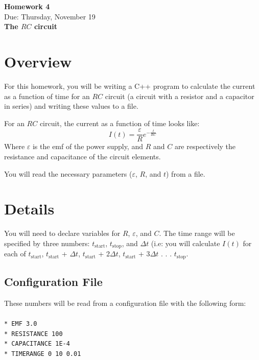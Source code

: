 \documentclass{article}
\begin{document}
\fancyfoot[C]{\thepage}
\vspace*{0cm}
\begin{center}
	{\LARGE \textbf{Homework 4}}\\
	\vspace{0.25cm}
	{\Large Due: Thursday, November 19}\\
	\vspace{0.25cm}
	{\Large \textbf{The $RC$ circuit}}
\end{center}

\section*{Overview}
For this homework, you will be writing a C++ program to calculate the current as a function of time for an $RC$ circuit (a circuit with a resistor and a capacitor in series) and writing these values to a file.

For an $RC$ circuit, the current as a function of time looks like:
\begin{equation}
	I(t) = \frac{\varepsilon}{R}e^{-\frac{t}{RC}}
\end{equation}
Where $\varepsilon$ is the emf of the power supply, and $R$ and $C$ are respectively the resistance and capacitance of the circuit elements.

You will read the necessary parameters ($\varepsilon$, $R$, and $t$) from a file.


\section*{Details}
You will need to declare variables for $R$, $\varepsilon$, and $C$. The time range will be specified by three numbers: $t_\mathrm{start}$, $t_\mathrm{stop}$, and $\Delta t$ (i.e: you will calculate $I(t)$ for each of $t_\mathrm{start}$, $t_\mathrm{start}$ + $\Delta t$, $t_\mathrm{start}$ + 2$\Delta t$, $t_\mathrm{start}$ + 3$\Delta t$ . . . $t_\mathrm{stop}$.

\subsection*{Configuration File}
These numbers will be read from a configuration file with the following form:\\
\null\\
\texttt{* EMF 3.0}\\
\texttt{* RESISTANCE 100}\\
\texttt{* CAPACITANCE 1E-4}\\
\texttt{* TIMERANGE 0 10 0.01}
\end{document}

